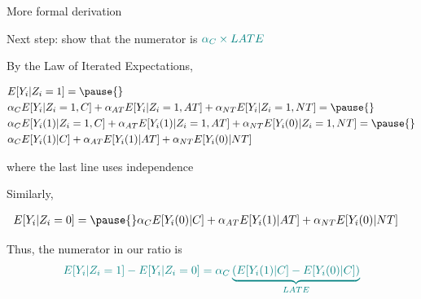 \documentclass[11pt,english,handout]{beamer}
\newenvironment{wideitemize}{\itemize\addtolength{\itemsep}{10pt}}{\enditemize}
\begin{document}
\begin{frame}{More formal derivation}

\begin{wideitemize}
	
	\item
	Next step: show that the {\color{teal} numerator} is $\color{teal} \alpha_C \times LATE$
	
	\pause
	
	\item 
	By the Law of Iterated Expectations, 
	\begin{small}
	\begin{align*}
	 &E[Y_i | Z_i = 1]  = \pause{}\\ %
	&\alpha_C E[ Y_i | Z_i = 1, C ] +  \alpha_{AT} E[ Y_i | Z_i = 1, AT ] + \alpha_{NT}E[Y_i | Z_i  =1, NT] =\pause{}\\%
	& \alpha_C E[ Y_i(1) | Z_i = 1, C ] +  \alpha_{AT} E[ Y_i(1) | Z_i = 1, AT ] + \alpha_{NT}E[Y_i(0) | Z_i  =1, NT] = \pause{}\\
	& \alpha_C E[ Y_i(1) | C ] +  \alpha_{AT} E[ Y_i(1) | AT ] + \alpha_{NT}E[Y_i(0) |  NT]
	\end{align*} 
	\end{small}	
	\noindent where the last line uses independence
	\item
	Similarly,
		\begin{small}
		\begin{align*}
			&E[Y_i | Z_i = 0]  = \pause{} \alpha_C E[ Y_i(0) | C ] +  \alpha_{AT} E[ Y_i(1) | AT ] + \alpha_{NT}E[Y_i(0) |  NT] %
		\end{align*} 
	\end{small}	

	\item
	Thus, the numerator in our ratio is 
	$$ \color{teal} E[Y_i | Z_i = 1] - E[Y_i | Z_i = 0]  = \alpha_C \underbrace{(E[Y_i(1) | C]  - E[Y_i(0) | C])}_{LATE}$$  
\end{wideitemize}	
	
\end{frame}
\end{document}
